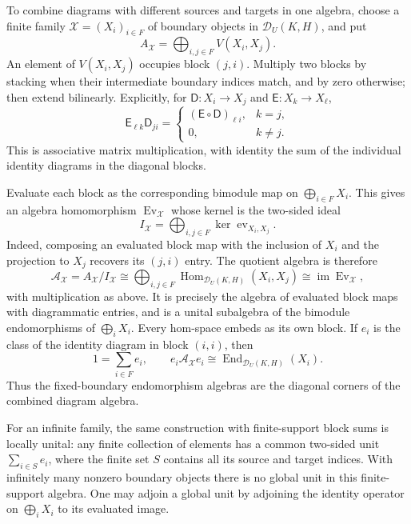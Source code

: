 \documentclass[11pt,a4paper]{article}
\numberwithin{equation}{section}
\theoremstyle{definition}
\newcommand{\Hom}{\operatorname{Hom}}
\newcommand{\End}{\operatorname{End}}
\begin{document}
To combine diagrams with different sources and targets in one
algebra, choose a finite family \(\mathcal X=(X_i)_{i\in F}\) of
boundary objects in \(\mathcal D_U(K,H)\), and put
\[
 A_{\mathcal X}=\bigoplus_{i,j\in F}V(X_i,X_j).
\]
An element of \(V(X_i,X_j)\) occupies block \((j,i)\). Multiply two
blocks by stacking when their intermediate boundary indices match,
and by zero otherwise; then extend bilinearly. Explicitly, for
\(\mathsf D:X_i\to X_j\) and \(\mathsf E:X_k\to X_\ell\),
\[
 \mathsf E_{\ell k}\mathsf D_{ji}=
 \begin{cases}
  (\mathsf E\circ\mathsf D)_{\ell i},&k=j,\\
  0,&k\ne j.
 \end{cases}
\]
This is associative matrix multiplication, with identity the sum of
the individual identity diagrams in the diagonal blocks.

Evaluate each block as the corresponding bimodule map on
\(\bigoplus_{i\in F}X_i\). This gives an algebra homomorphism
\(\operatorname{Ev}_{\mathcal X}\) whose kernel is the two-sided ideal
\[
 I_{\mathcal X}=\bigoplus_{i,j\in F}\ker\operatorname{ev}_{X_i,X_j}.
\]
Indeed, composing an evaluated block map with the inclusion of
\(X_i\) and the projection to \(X_j\) recovers its \((j,i)\) entry.
The quotient algebra is therefore
\[
 \mathcal A_{\mathcal X}=A_{\mathcal X}/I_{\mathcal X}
   \cong\bigoplus_{i,j\in F}
     \Hom_{\mathcal D_U(K,H)}(X_i,X_j)
   \cong\operatorname{im}\operatorname{Ev}_{\mathcal X},
\]
with multiplication as above. It is precisely the algebra of
evaluated block maps with diagrammatic entries, and is a unital
subalgebra of the bimodule endomorphisms of \(\bigoplus_iX_i\).
Every hom-space embeds as its own block. If \(e_i\) is the class of
the identity diagram in block \((i,i)\), then
\[
 1=\sum_{i\in F}e_i,\qquad
 e_i\mathcal A_{\mathcal X}e_i
   \cong\End_{\mathcal D_U(K,H)}(X_i).
\]
Thus the fixed-boundary endomorphism algebras are the diagonal
corners of the combined diagram algebra.

For an infinite family, the same construction with finite-support
block sums is locally unital: any finite collection of elements has
a common two-sided unit \(\sum_{i\in S}e_i\), where the finite set
\(S\) contains all its source and target indices. With infinitely
many nonzero boundary objects there is no global unit in this
finite-support algebra. One may adjoin a global unit by adjoining
the identity operator on \(\bigoplus_iX_i\) to its evaluated image.
\end{document}

